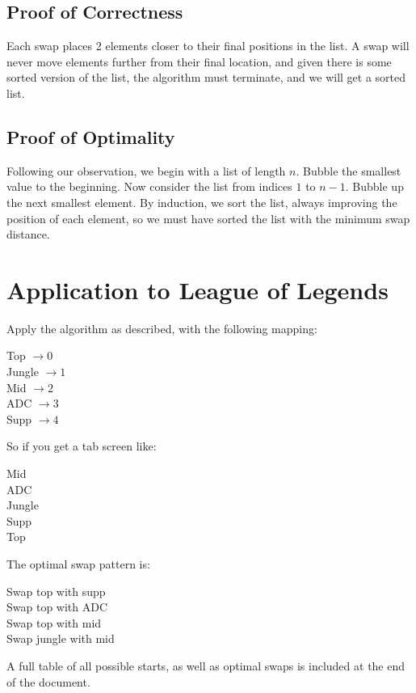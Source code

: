 \documentclass[11pt, oneside]{article}   	%
\begin{document}
\subsection{Proof of Correctness}
Each swap places 2 elements closer to their final positions in the list. A swap will never move elements further from their final location, and given there is some sorted version of the list, the algorithm must terminate, and we will get a sorted list.

\subsection{Proof of Optimality}
Following our observation, we begin with a list of length $n$. Bubble the smallest value to the beginning. Now consider the list from indices $1$ to $n-1$. Bubble up the next smallest element. By induction, we sort the list, always improving the position of each element, so we must have sorted the list with the minimum swap distance. 

\section{Application to League of Legends}

Apply the algorithm as described, with the following mapping:

\begin{center}
Top $\to 0$\\
Jungle $\to 1$ \\
Mid $\to 2$\\
ADC $\to 3$\\
Supp $\to 4$
\end{center}

So if you get a tab screen like:

\begin{center}
Mid\\
ADC\\
Jungle\\
Supp\\
Top
\end{center}

The optimal swap pattern is:

Swap top with supp\\
Swap top with ADC\\
Swap top with mid\\
Swap jungle with mid

A full table of all possible starts, as well as optimal swaps is included at the end of the document.
\end{document}
